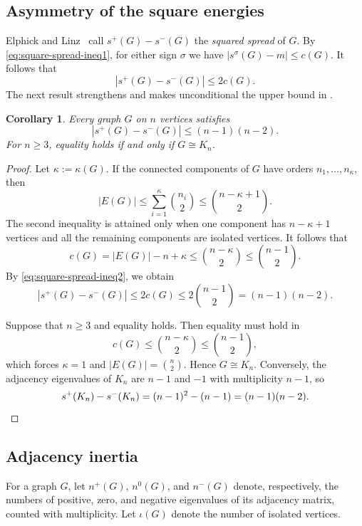 \documentclass[11pt,letterpaper,reqno]{amsart}
\newtheorem{corollary}[theorem]{Corollary}
\theoremstyle{definition}
\begin{document}
\subsection{Asymmetry of the square energies}

Elphick and Linz~\cite{EL} call $s^+(G)-s^-(G)$ the \emph{squared spread} of
$G$. By \eqref{eq:square-spread-ineq1}, for either sign $\sigma$ we have $|s^\sigma(G)-m|\le c(G)$. It follows that
\begin{equation}\label{eq:square-spread-ineq2}
    |s^+(G)-s^-(G)|\le 2c(G).
\end{equation}
The next result strengthens and makes unconditional the upper bound in
\cite[Proposition~4.1]{EL}.

\begin{corollary}\label{cor:absolute-spread}
Every graph $G$ on $n$ vertices satisfies
\[
    |s^+(G)-s^-(G)|\le (n-1)(n-2).
\]
For $n\ge3$, equality holds if and only if $G\cong K_n$.
\end{corollary}

\begin{proof}
Let $\kappa:=\kappa(G)$.  If the connected components of $G$ have orders
$n_1,\ldots,n_\kappa$, then
\[
    |E(G)|
    \le \sum_{i=1}^{\kappa}\binom{n_i}{2}
    \le \binom{n-\kappa+1}{2}.
\]
The second inequality is attained only when one component has
$n-\kappa+1$ vertices and all the remaining components are isolated
vertices.  It follows that
\[
    c(G)
    =|E(G)|-n+\kappa
    \le \binom{n-\kappa}{2}
    \le \binom{n-1}{2}.
\]
By \eqref{eq:square-spread-ineq2}, we obtain
\[
    |s^+(G)-s^-(G)|
    \le 2c(G)\le 2\binom{n-1}{2}
    =(n-1)(n-2).
\]

Suppose that $n\ge3$ and equality holds.  Then equality must hold in
\[
    c(G)\le\binom{n-\kappa}{2}\le\binom{n-1}{2},
\]
which forces $\kappa=1$ and $|E(G)|=\binom n2$.  Hence $G\cong K_n$.
Conversely, the adjacency eigenvalues of $K_n$ are $n-1$ and $-1$ with
multiplicity $n-1$, so
\[
    s^+(K_n)-s^-(K_n)
    =(n-1)^2-(n-1)
    =(n-1)(n-2).
\qedhere\]
\end{proof}





\subsection{Adjacency inertia}

For a graph $G$, let $n^+(G)$, $n^0(G)$, and $n^-(G)$ denote,
respectively, the numbers of positive, zero, and negative eigenvalues of its
adjacency matrix, counted with multiplicity.  Let $\iota(G)$ denote the
number of isolated vertices.
\end{document}

